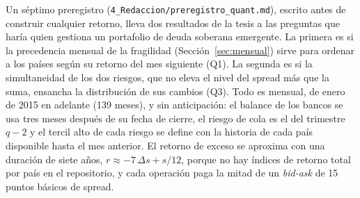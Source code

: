 Un séptimo preregistro (\texttt{4\_Redaccion/preregistro\_quant.md}), escrito antes de construir cualquier retorno, lleva dos resultados de la tesis a las preguntas que haría quien gestiona un portafolio de deuda soberana emergente. La primera es si la precedencia mensual de la fragilidad (Sección~\ref{sec:mensual}) sirve para ordenar a los países según su retorno del mes siguiente (Q1). La segunda es si la simultaneidad de los dos riesgos, que no eleva el nivel del spread más que la suma, ensancha la distribución de sus cambios (Q3). Todo es mensual, de enero de 2015 en adelante (139 meses), y sin anticipación: el balance de los bancos se usa tres meses después de su fecha de cierre, el riesgo de cola es el del trimestre $q-2$ y el tercil alto de cada riesgo se define con la historia de cada país disponible hasta el mes anterior. El retorno de exceso se aproxima con una duración de siete años, $r\approx-7\,\Delta s+s/12$, porque no hay índices de retorno total por país en el repositorio, y cada operación paga la mitad de un \textit{bid-ask} de 15 puntos básicos de spread.

